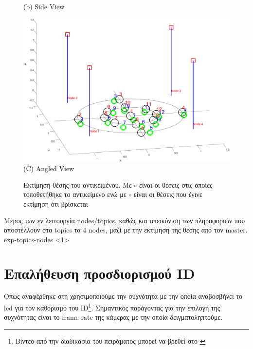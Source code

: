 \begin{figure} [H]
\begin{minipage}{.5\textwidth}
      {(b) Side View}
	  \end{minipage}
  \begin{minipage}{\textwidth}
    \centering
    \includegraphics[width=.8\linewidth]{../Images/Experiments-Results/nodes-pos-with-est-angle.png}\\
    {(C) Angled View}
  \end{minipage}
    \hfill \break
    \decoRule
    \caption[Εκτίμηση θέσης του αντικειμένου.]{Εκτίμηση θέσης του αντικειμένου. Με \textcolor{black}{\LARGE$\circ$} είναι οι θέσεις στις οποίες τοποθετήθηκε το αντικείμενο ενώ με \textcolor{green}{\LARGE$\circ$} είναι οι θέσεις που έγινε εκτίμηση ότι βρίσκεται} %
    \label{fig:multi-exp-pos-estimations}
\end{figure}

{Μέρος των εν λειτουργία nodes/topics, καθώς και απεικόνιση των πληροφοριών που αποστέλλουν στα topics τα 4 nodes, μαζί με την εκτίμηση της θέσης από τον master.}%
{exp-topics-nodes}%
<1>


\section{Επαλήθευση προσδιορισμού ID}
Όπως αναφέρθηκε στη  χρησιμοποιούμε την συχνότητα με την οποία αναβοσβήνει το led για τον καθορισμό του ID\footnote{Βίντεο από την διαδικασία του πειράματος μπορεί να βρεθεί στο \cite{experiment-blink-video}}. Σημαντικός παράγοντας για την επιλογή της συχνότητας είναι το frame-rate της κάμερας με την οποία δειγματοληπτούμε. 

